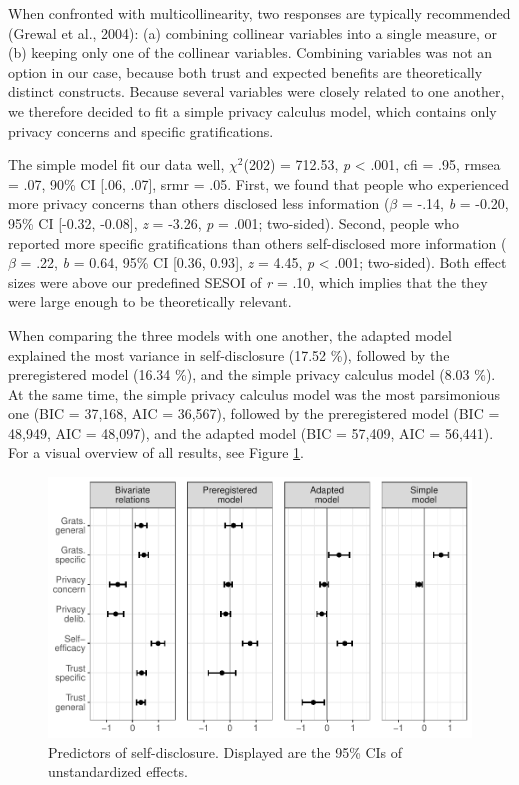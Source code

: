 \documentclass[
  english,
  man,floatsintext]{apa6}
\begin{document}
When confronted with multicollinearity, two responses are typically recommended (Grewal et al., 2004):
(a) combining collinear variables into a single measure, or (b) keeping only one of the collinear variables.
Combining variables was not an option in our case, because both trust and expected benefits are theoretically distinct constructs.
Because several variables were closely related to one another, we therefore decided to fit a simple privacy calculus model, which contains only privacy concerns and specific gratifications.

The simple model fit our data well, \(\chi^2\)(202) = 712.53, \textit{p} \textless{} .001, cfi = .95, rmsea = .07, 90\% CI {[}.06, .07{]}, srmr = .05.
First, we found that people who experienced more privacy concerns than others disclosed less information (\(\beta\) = -.14, \textit{b} = -0.20, 95\% CI {[}-0.32, -0.08{]}, \textit{z} = -3.26, \textit{p} = .001; two-sided).
Second, people who reported more specific gratifications than others self-disclosed more information (\(\beta\) = .22, \textit{b} = 0.64, 95\% CI {[}0.36, 0.93{]}, \textit{z} = 4.45, \textit{p} \textless{} .001; two-sided).
Both effect sizes were above our predefined SESOI of \emph{r} = .10, which implies that the they were large enough to be theoretically relevant.

When comparing the three models with one another, the adapted model explained the most variance in self-disclosure (17.52 \%), followed by the preregistered model (16.34 \%), and the simple privacy calculus model (8.03 \%).
At the same time, the simple privacy calculus model was the most parsimonious one (BIC = 37,168, AIC = 36,567), followed by the preregistered model (BIC = 48,949, AIC = 48,097), and the adapted model (BIC = 57,409, AIC = 56,441).
For a visual overview of all results, see Figure \ref{fig:plotpc}.

\begin{figure}[!h]
\includegraphics[width=\textwidth]{manuscript_files/figure-latex/plotpc-1} \caption{Predictors of self-disclosure. Displayed are the 95\% CIs of unstandardized effects.}\label{fig:plotpc}
\end{figure}
\end{document}

